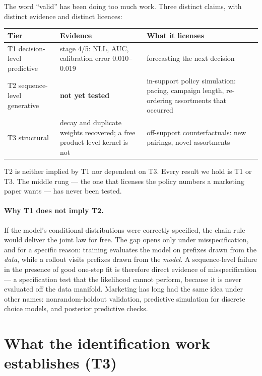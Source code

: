 \documentclass[11pt]{article}
\begin{document}
The word ``valid'' has been doing too much work. Three distinct claims, with
distinct evidence and distinct licences:

\begin{center}\small
\begin{tabular}{p{2.6cm}p{4.3cm}p{4.3cm}}
\toprule
Tier & Evidence & What it licenses \\
\midrule
T1 decision-level predictive & stage 4/5: NLL, AUC, calibration error
0.010--0.019 & forecasting the next decision \\
T2 sequence-level generative & \textbf{not yet tested} & in-support policy
simulation: pacing, campaign length, re-ordering assortments that occurred \\
T3 structural & decay and duplicate weights recovered; a free product-level
kernel is not & off-support counterfactuals: new pairings, novel assortments \\
\bottomrule
\end{tabular}
\end{center}

\noindent T2 is neither implied by T1 nor dependent on T3. Every result we hold
is T1 or T3. The middle rung --- the one that licenses the policy numbers a
marketing paper wants --- has never been tested.

\paragraph{Why T1 does not imply T2.} If the model's conditional distributions
were correctly specified, the chain rule would deliver the joint law for free.
The gap opens only under misspecification, and for a specific reason: training
evaluates the model on prefixes drawn from the \emph{data}, while a rollout
visits prefixes drawn from the \emph{model}. A sequence-level failure in the
presence of good one-step fit is therefore direct evidence of misspecification
--- a specification test that the likelihood cannot perform, because it is
never evaluated off the data manifold. Marketing has long had the same idea
under other names: nonrandom-holdout validation, predictive simulation for
discrete choice models, and posterior predictive checks.

\section{What the identification work establishes (T3)}
\end{document}
